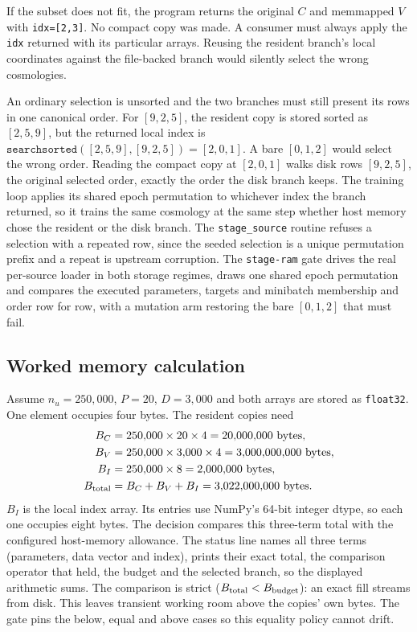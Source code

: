 \documentclass[10pt,aps,prd,twocolumn,nofootinbib]{revtex4-2}
\newcommand{\code}[1]{\texttt{#1}}
\begin{document}
If the subset does not fit, the program returns the original $C$ and memmapped
$V$ with \code{idx=[2,3]}.  No compact copy was made.  A consumer must always
apply the \code{idx} returned with its particular arrays.  Reusing the
resident branch's local coordinates against the file-backed branch would
silently select the wrong cosmologies.

An ordinary selection is unsorted and the two branches must still present its
rows in one canonical order.  For $[9,2,5]$, the resident copy is stored
sorted as $[2,5,9]$, but the returned local index is
$\code{searchsorted}([2,5,9],[9,2,5])=[2,0,1]$.  A bare $[0,1,2]$ would select
the wrong order.  Reading the compact copy at $[2,0,1]$ walks disk rows
$[9,2,5]$, the original
selected order, exactly the order the disk branch keeps.  The training loop
applies its shared epoch permutation to whichever index the branch returned,
so it trains the same cosmology at the same step whether host memory chose the
resident or the disk branch.  The \code{stage\_source} routine refuses a
selection with a repeated row, since the seeded selection is a unique
permutation prefix and a repeat is upstream corruption.  The \code{stage-ram}
gate drives the real per-source loader in both storage regimes, draws one
shared epoch permutation and compares the executed parameters, targets and
minibatch membership and order row for row, with a mutation arm restoring the
bare $[0,1,2]$ that must fail.

\subsection{Worked memory calculation}

Assume $n_u=250{,}000$, $P=20$, $D=3{,}000$ and both arrays are stored as
\code{float32}.  One element occupies four bytes.  The resident copies need
\begin{align*}
  B_C &= 250{,}000\times20\times4
       =20{,}000{,}000\ \text{bytes},\\
  B_V &= 250{,}000\times3{,}000\times4
       =3{,}000{,}000{,}000\ \text{bytes},\\
  B_I &= 250{,}000\times8
       =2{,}000{,}000\ \text{bytes},\\
  B_{\rm total}&=B_C+B_V+B_I=3{,}022{,}000{,}000\ \text{bytes}.
\end{align*}
$B_I$ is the local index array.  Its entries use NumPy's 64-bit integer
dtype, so each one occupies eight bytes.  The decision compares this
three-term total with the configured host-memory allowance.  The status line
names all three terms (parameters, data vector and index), prints their
exact total, the comparison operator that held, the budget and the selected
branch, so the displayed arithmetic sums.  The comparison is strict
($B_{\rm total}<B_{\rm budget}$): an exact fill streams from disk.  This leaves
transient working room above the copies' own bytes.  The gate pins the
below, equal and above cases so this equality policy cannot drift.
\end{document}

